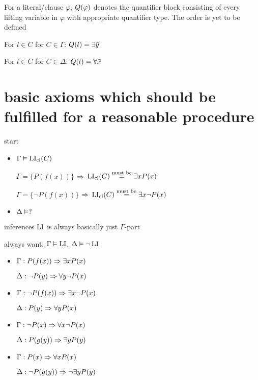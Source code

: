 \documentclass[,%
	draft=false,%
	numbers=noendperiod
	11pt,
	a4paper,
	oneside,%
	openany,
]{memoir}
\begin{document}
\begin{defi}[$\Q$]
	For a literal/clause $\varphi$, $Q(\varphi)$ denotes the quantifier block consisting of every lifting variable in $\varphi$ with appropriate quantifier type.
	The order is yet to be defined
\end{defi}

For $l \in C$ for $C \in \Gamma$: $Q(l) = \exists \bar y$

For $l \in C$ for $C \in \Delta$: $Q(l) = \forall \bar x$

\section*{basic axioms which should be fulfilled for a reasonable procedure}

\noindent
start

\begin{itemize}
	\item
		$\Gamma \vDash \operatorname{LI}_{\operatorname{cl}}(C)$

		$\Gamma = \{ P(f(x)) \}$ $\Rightarrow$ $\operatorname{LI}_{\operatorname{cl}}(C) \stackrel{\text{must be}}= \exists x P(x) $

		$\Gamma = \{ \lnot P(f(x)) \}$ $\Rightarrow$ $\operatorname{LI}_{\operatorname{cl}}(C) \stackrel{\text{must be}}= \exists x \lnot P(x) $

	\item
		$\Delta \vDash ?$

\end{itemize}

\noindent
inferences $\operatorname{LI}$ is always basically just $\Gamma$-part

always want: $\Gamma \vDash \operatorname{LI}$, $\Delta \vDash \lnot \operatorname{LI}$

\begin{itemize}
	\item
		$\Gamma: P(f(x)) \Rightarrow \exists x P(x)$

		$\Delta: \lnot P(y) \Rightarrow \forall y \lnot P(x)$

	\item
		$\Gamma: \lnot P(f(x)) \Rightarrow \exists x\lnot  P(x)$

		$\Delta: P(y) \Rightarrow \forall y P(x)$

	\item
		$\Gamma: \lnot P(x) \Rightarrow \forall x \lnot P(x) $

		$\Delta: P(g(y)) \Rightarrow \exists y P(y)$

	\item
		$\Gamma: P(x) \Rightarrow \forall x P(x) $

		$\Delta: \lnot P(g(y)) \Rightarrow \lnot \exists y P(y)$

\end{itemize}
\end{document}
